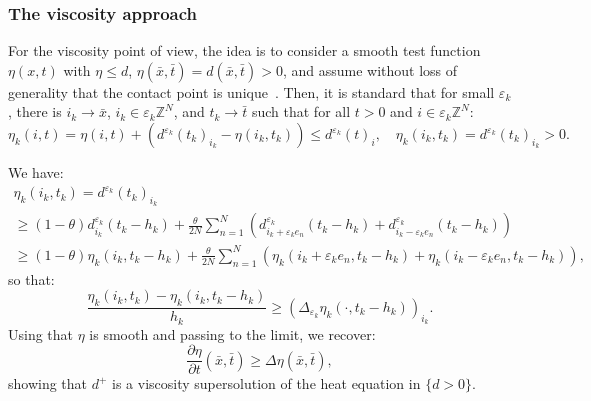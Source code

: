 \documentclass[10pt]{amsart}
\theoremstyle{plain}
\theoremstyle{definition}
\newcommand{\Z}{\mathbb{Z}}
\newcommand{\e}{\varepsilon}
\numberwithin{equation}{section}
\begin{document}
\subsubsection*{The viscosity approach}
For the viscosity point of view, the idea is to consider a smooth
test function $\eta(x,t)$ with $\eta\le d$, $\eta(\bar x,\bar t)=d(\bar x,\bar t)>0$, and assume without loss of generality that the contact point is unique~\cite{CIL}.
Then, it is standard that for small $\e_k$, there is
$i_k\to \bar x$, $i_k\in\e_k\Z^N$, and $t_k\to \bar t$ such that
for all $t>0$ and $i\in \e_k\Z^N$:
\[
  \eta_k(i,t)=  \eta(i,t) + (d^{\e_k}(t_k)_{i_k} - \eta(i_k,t_k) )
  \le d^{\e_k}(t)_i,
  \quad \eta_k(i_k,t_k) = d^{\e_k}(t_k)_{i_k} >0.
\]

We have:
\begin{multline*}
  \eta_k(i_k,t_k) =d^{\e_k}(t_k)_{i_k}\\
  \ge
(1-\theta) d_{i_k}^{\e_k}(t_k-h_k) + \frac{\theta}{2N}\sum_{n=1}^N
\left(d_{i_k+\e_k e_n}^{\e_k}(t_k-h_k)
  + d_{i_k-\e_k e_n}^{\e_k}(t_k-h_k)\right)
\\ 
\ge (1-\theta) \eta_k(i_k,t_k-h_k) + \frac{\theta}{2N}\sum_{n=1}^N
  \left(\eta_k(i_k+\e_k e_n,t_k-h_k) + \eta_k(i_k-\e_k e_n,t_k-h_k)\right),
\end{multline*}
so that:
\[
  \frac{\eta_k(i_k,t_k)-\eta_k(i_k,t_k-h_k)}{h_k}
  \ge \left(\Delta_{\e_k}\eta_k(\cdot,t_k-h_k)\right)_{i_k}.
\]
Using that $\eta$ is smooth and passing to the limit, we recover:
\[
  \frac{\partial\eta}{\partial t}(\bar x,\bar t)\ge \Delta\eta(\bar x,\bar t),
\]
showing that $d^+$ is a viscosity supersolution of the heat equation
in $\{d>0\}$.
\end{document}
